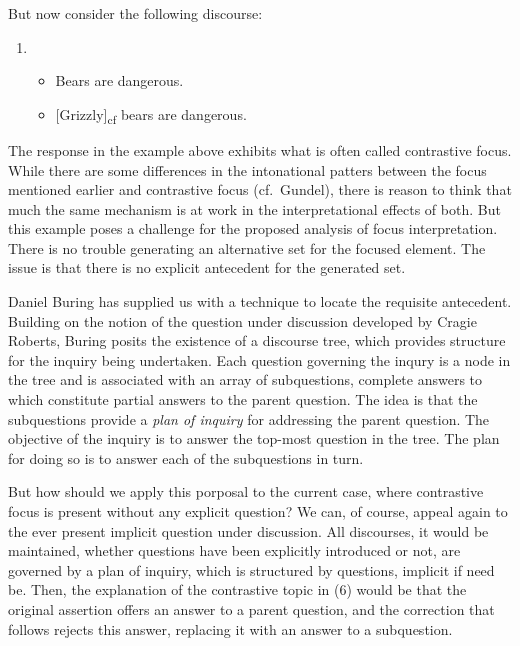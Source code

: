 \documentclass[letterpaper,]{article}
\begin{document}
But now consider the following discourse:

\begin{enumerate}
\def\labelenumi{(\arabic{enumi})}
\setcounter{enumi}{5}
\item
  \begin{itemize}
  \itemsep1pt\parskip0pt
  \item
    Bears are dangerous.
  \item
    {[}Grizzly{]}\textsubscript{cf} bears are dangerous.
  \end{itemize}
\end{enumerate}

The response in the example above exhibits what is often called
contrastive focus. While there are some differences in the intonational
patters between the focus mentioned earlier and contrastive focus
(cf.~Gundel), there is reason to think that much the same mechanism is
at work in the interpretational effects of both. But this example poses
a challenge for the proposed analysis of focus interpretation. There is
no trouble generating an alternative set for the focused element. The
issue is that there is no explicit antecedent for the generated set.

Daniel Buring has supplied us with a technique to locate the requisite
antecedent. Building on the notion of the question under discussion
developed by Cragie Roberts, Buring posits the existence of a discourse
tree, which provides structure for the inquiry being undertaken. Each
question governing the inqury is a node in the tree and is associated
with an array of subquestions, complete answers to which constitute
partial answers to the parent question. The idea is that the
subquestions provide a \emph{plan of inquiry} for addressing the parent
question. The objective of the inquiry is to answer the top-most
question in the tree. The plan for doing so is to answer each of the
subquestions in turn.

But how should we apply this porposal to the current case, where
contrastive focus is present without any explicit question? We can, of
course, appeal again to the ever present implicit question under
discussion. All discourses, it would be maintained, whether questions
have been explicitly introduced or not, are governed by a plan of
inquiry, which is structured by questions, implicit if need be. Then,
the explanation of the contrastive topic in (6) would be that the
original assertion offers an answer to a parent question, and the
correction that follows rejects this answer, replacing it with an answer
to a subquestion.
\end{document}
